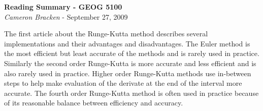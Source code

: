\documentclass[11pt,oneside]{article}
\begin{document}
\begin{center}
	\textbf{Reading Summary - GEOG 5100}\\
	{\itshape Cameron Bracken} - September 27, 2009
\end{center}

The first article about the Runge-Kutta method describes several implementations and their advantages and disadvantages. The Euler method is the most efficient but least accurate of the methods and is rarely used in practice.   Similarly the second order Runge-Kutta is more accurate and less efficient and is also rarely used in practice.  Higher order Runge-Kutta methods use in-between steps to help make evaluation of the derivate at the  end of the interval more accurate. The fourth order Runge-Kutta method is often used in practice because of its reasonable balance between efficiency and accuracy. 
\end{document}
